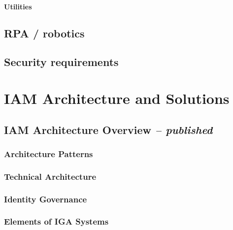 \hypertarget{utilities}{%
\subsubsection{Utilities}\label{utilities}}

\hypertarget{rpa-robotics}{%
\section{RPA / robotics}\label{rpa-robotics}}

\hypertarget{security-requirements}{%
\section{Security requirements}\label{security-requirements}}

\hypertarget{iam-architecture-and-solutions}{%
\chapter{IAM Architecture and Solutions
}\label{iam-architecture-and-solutions}}

\hypertarget{iam-architecture-overview-published}{%
\section{\texorpdfstring{IAM Architecture Overview \emph{--
published}}{IAM Architecture Overview -- published}}\label{iam-architecture-overview-published}}

\hypertarget{architecture-patterns}{%
\subsection{Architecture Patterns }\label{architecture-patterns}}

\hypertarget{technical-architecture}{%
\subsection{Technical Architecture }\label{technical-architecture}}

\hypertarget{identity-governance}{%
\subsection{Identity Governance }\label{identity-governance}}

\hypertarget{elements-of-iga-systems}{%
\subsection{Elements of IGA Systems }\label{elements-of-iga-systems}}

